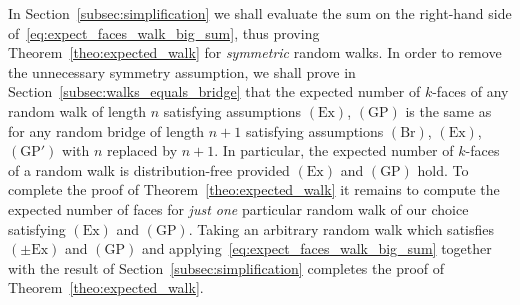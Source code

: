 \documentclass[12pt, reqno]{amsart}
\theoremstyle{plain}
\theoremstyle{definition}
\theoremstyle{remark}
\begin{document}
In Section~\ref{subsec:simplification} we shall evaluate the sum on the right-hand side of~\eqref{eq:expect_faces_walk_big_sum}, thus proving Theorem~\ref{theo:expected_walk} for \emph{symmetric} random walks. In order to remove the unnecessary symmetry assumption, we shall prove in
Section~\ref{subsec:walks_equals_bridge} that the expected number of $k$-faces of any random walk of length $n$ satisfying assumptions $(\text{Ex})$, $(\text{GP})$ is the same as for any random bridge of length $n+1$ satisfying assumptions $(\text{Br})$, $(\text{Ex})$, $(\text{GP}')$ with $n$ replaced by $n+1$. In particular, the expected number of $k$-faces of a random walk is distribution-free provided $(\text{Ex})$ and $(\text{GP})$ hold. To complete the proof of Theorem~\ref{theo:expected_walk} it remains to compute the expected number of faces for \emph{just one} particular random walk of our choice satisfying $(\text{Ex})$ and $(\text{GP})$. Taking an arbitrary random walk which satisfies $(\pm\text{Ex})$ and $(\text{GP})$ and applying~\eqref{eq:expect_faces_walk_big_sum} together with the result of Section~\ref{subsec:simplification} completes the proof of Theorem~\ref{theo:expected_walk}.
\end{document}
